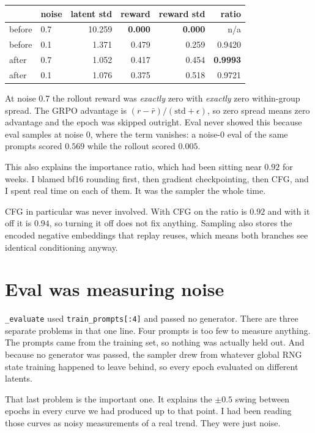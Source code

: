 \documentclass[11pt]{article}
\newcommand{\code}[1]{\texttt{\small #1}}
\begin{document}
\begin{center}
\small
\begin{tabular}{@{}llrrrr@{}}
\toprule
& \textbf{noise} & \textbf{latent std} & \textbf{reward} & \textbf{reward std} & \textbf{ratio} \\
\midrule
before & 0.7 & 10.259 & \textbf{0.000} & \textbf{0.000} & n/a \\
before & 0.1 & 1.371 & 0.479 & 0.259 & 0.9420 \\
after  & 0.7 & 1.052 & 0.417 & 0.454 & \textbf{0.9993} \\
after  & 0.1 & 1.076 & 0.375 & 0.518 & 0.9721 \\
\bottomrule
\end{tabular}
\end{center}

At noise $0.7$ the rollout reward was \emph{exactly} zero with \emph{exactly} zero within-group spread. The GRPO advantage is $(r-\bar r)/(\text{std}+\epsilon)$, so zero spread means zero advantage and the epoch was skipped outright. Eval never showed this because eval samples at noise $0$, where the term vanishes: a noise-0 eval of the same prompts scored $0.569$ while the rollout scored $0.005$.

This also explains the importance ratio, which had been sitting near $0.92$ for weeks. I blamed bf16 rounding first, then gradient checkpointing, then CFG, and I spent real time on each of them. It was the sampler the whole time.

CFG in particular was never involved. With CFG on the ratio is $0.92$ and with it off it is $0.94$, so turning it off does not fix anything. Sampling also stores the encoded negative embeddings that replay reuses, which means both branches see identical conditioning anyway.

\section{Eval was measuring noise}

\code{\_evaluate} used \code{train\_prompts[:4]} and passed no generator. There are three separate problems in that one line. Four prompts is too few to measure anything. The prompts came from the training set, so nothing was actually held out. And because no generator was passed, the sampler drew from whatever global RNG state training happened to leave behind, so every epoch evaluated on different latents.

That last problem is the important one. It explains the $\pm 0.5$ swing between epochs in every curve we had produced up to that point. I had been reading those curves as noisy measurements of a real trend. They were just noise.
\end{document}
